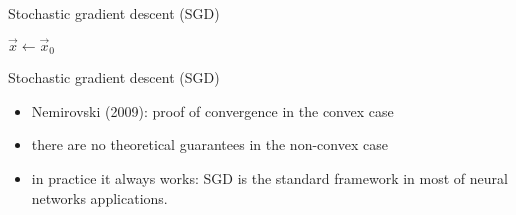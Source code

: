 \begin{frame}{Stochastic gradient descent (SGD)}
\begin{algorithm}[H]
	
	\BlankLine
	
	$\vec{x} \gets \vec{x}_0$\\
	\caption{Stochastic gradient descent}
	\label{algo:sgd}
\end{algorithm}	
\end{frame}

\begin{frame}{Stochastic gradient descent (SGD)}
	\begin{itemize}
		\item Nemirovski (2009)\cite{Nemirovski}: proof of convergence in the convex case
		\item there are no theoretical guarantees in the non-convex case 
		\item in practice it always works: SGD is the standard framework in most of neural networks applications.
	\end{itemize}
\end{frame}